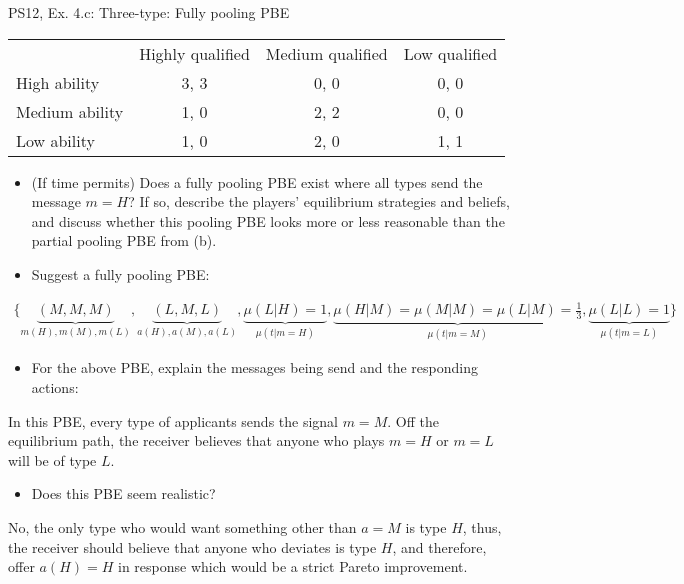 \begin{frame}{PS12, Ex. 4.c: Three-type: Fully pooling PBE}
    \begin{table}
      \begin{tabular}{l|c|c|c|}
          \multicolumn{1}{c}{} & \multicolumn{1}{c}{Highly qualified} & \multicolumn{1}{c}{Medium qualified} & \multicolumn{1}{c}{Low qualified} \\\cline{2-4}
          High ability   & 3, 3 & 0, 0 & 0, 0 \\\cline{2-4}
          Medium ability & 1, 0 & 2, 2 & 0, 0 \\\cline{2-4}
          Low ability    & 1, 0 & 2, 0 & 1, 1 \\\cline{2-4}
      \end{tabular}
    \end{table}\vspace{-8pt}
    \begin{itemize}
      \item[(c)] (If time permits) Does a fully pooling PBE exist where all types send the message $m = H$? If so, describe the players’ equilibrium strategies and beliefs, and discuss whether this pooling PBE looks  more or less reasonable than the partial pooling PBE from (b).
      \item[Step 1:] Suggest a fully pooling PBE:
    \end{itemize}\vspace{-12pt}
    \begin{align*}
      \{\underbrace{(M,M,M)}_{m(H),m(M),m(L)},\underbrace{(L,M,L)}_{a(H),a(M),a(L)},\underbrace{\mu(L|H)=1}_{\mu(t|m=H)},\underbrace{\mu(H|M)=\mu(M|M)=\mu(L|M)=\frac{1}{3}}_{\mu(t|m=M)},\underbrace{\mu(L|L)=1}_{\mu(t|m=L)}\}
    \end{align*}\vspace{-14pt}
    \begin{itemize}
        \item[Step 2:] For the above PBE, explain the messages being send and the responding actions:
    \end{itemize}\vspace{-2pt}
    In this PBE, every type of applicants sends the signal $m=M$. Off the equilibrium path, the receiver believes that anyone who plays $m=H$ or $m=L$ will be of type $L$.\vspace{-2pt}
    \begin{itemize}
        \item[Step 3:] Does this PBE seem realistic?
    \end{itemize}\vspace{-2pt}
    No, the only type who would want something other than $a=M$ is type $H$, thus, the receiver should believe that anyone who deviates is type $H$, and therefore, offer $a(H)=H$ in response which would be a strict Pareto improvement.
    \vfill\null
\end{frame}
